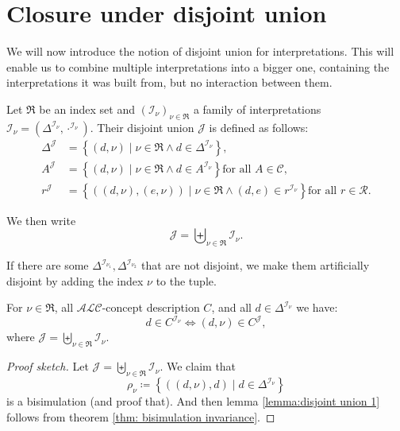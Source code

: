 \section{Closure under disjoint union}
We will now introduce the notion of disjoint union for interpretations.
This will enable us to combine multiple interpretations into a bigger one, containing the interpretations it was built from,
but no interaction between them.
\begin{definition}
	Let $\mathfrak{R}$ be an index set and $\left( \mathcal{I}_{\nu} \right)_{\nu \in \mathfrak{R}}$ a family of interpretations $\mathcal{I}_{\nu} = \left( \Delta^{\mathcal{I}_{\nu}}, \cdot^{\mathcal{I}_{\nu}} \right)$.
	Their disjoint union $\mathcal{J}$ is defined as follows:
	\begin{align*}
		\Delta^{\mathcal{J}} &= \left\{ (d,\nu) \mid \nu \in \mathfrak{R}\land d \in \Delta^{\mathcal{I}_{\nu}} \right\}, \\
		A^{\mathcal{J}} &= \left\{ (d,\nu) \mid \nu \in \mathfrak{R} \land d \in A^{\mathcal{I}_\nu}\right\} \text{for all } A \in \mathscr{C}, \\
		r^{\mathcal{J}} &= \left\{ \left( (d,\nu),(e,\nu) \right) \mid \nu \in \mathfrak{R} \land (d,e) \in r^{\mathcal{I}_\nu} \right\} \text{for all } r \in \mathscr{R}.
	\end{align*}
\end{definition}
\begin{notation}
	We then write
	\[
	\mathcal{J} = \biguplus_{\nu \in \mathfrak{R}} \mathcal{I}_{\nu}
	.\]
\end{notation}
\begin{note}
	If there are some $\Delta^{\mathcal{I}_{\nu_1}}, \Delta^{\mathcal{I}_{\nu_2}}$ that are not disjoint,
	we make them artificially disjoint by adding the index $\nu$ to the tuple.
\end{note}

\begin{lemma}\label{lemma:disjoint union 1}
	For $\nu \in \mathfrak{R}$, all $\mathcal{ALC}$-concept description $C$, and all $d \in \Delta^{\mathcal{I}_\nu}$ we have:
	\[
		d \in C^{\mathcal{I}_\nu} \iff (d,\nu) \in C^{\mathcal{J}}
	,\]
	where $\mathcal{J} = \biguplus_{\nu \in \mathfrak{R}} \mathcal{I}_{\nu}$.
\end{lemma}
\begin{proof}[Proof sketch]
	Let $\mathcal{J} = \biguplus_{\nu \in \mathfrak{R}} \mathcal{I}_\nu$.
	We claim that
	\[
	\rho_\nu \coloneqq \left\{ \left( (d,\nu),d \right) \mid d \in \Delta^{\mathcal{I}_\nu} \right\}
	\]
	is a bisimulation (and proof that).
	And then lemma \ref{lemma:disjoint union 1} follows from theorem \ref{thm: bisimulation invariance}.
\end{proof}

